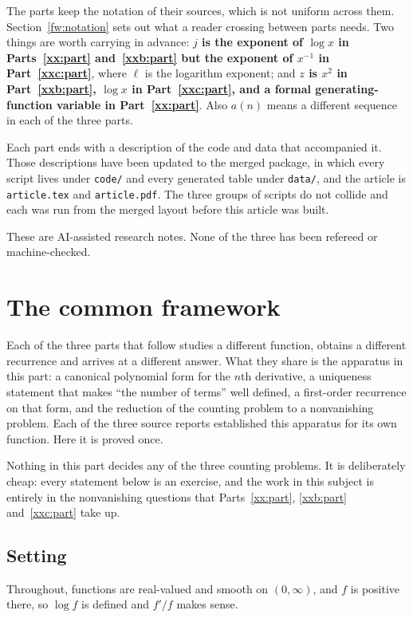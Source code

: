 \documentclass[11pt,a4paper]{article}
\numberwithin{equation}{section}
\theoremstyle{definition}
\theoremstyle{remark}
\theoremstyle{plain}
\begin{document}
The parts keep the notation of their sources, which is not uniform across them.
Section~\ref{fw:notation} sets out what a reader crossing between parts needs.
Two things are worth carrying in advance: \textbf{$j$ is the exponent of
$\log x$ in Parts~\ref{xx:part} and~\ref{xxb:part} but the exponent of $x^{-1}$
in Part~\ref{xxc:part}}, where $\ell$ is the logarithm exponent; and
\textbf{$z$ is $x^2$ in Part~\ref{xxb:part}, $\log x$ in Part~\ref{xxc:part},
and a formal generating-function variable in Part~\ref{xx:part}}.  Also
$a(n)$ means a different sequence in each of the three parts.

Each part ends with a description of the code and data that accompanied it.
Those descriptions have been updated to the merged package, in which every
script lives under \texttt{code/} and every generated table under
\texttt{data/}, and the article is \texttt{article.tex} and
\texttt{article.pdf}.  The three groups of scripts do not collide and each was
run from the merged layout before this article was built.

These are AI-assisted research notes.  None of the three has been refereed or
machine-checked.

\section{The common framework}\label{fw:sec}

Each of the three parts that follow studies a different function, obtains a
different recurrence and arrives at a different answer.  What they share is the
apparatus in this part: a canonical polynomial form for the $n$th derivative, a
uniqueness statement that makes ``the number of terms'' well defined, a
first-order recurrence on that form, and the reduction of the counting problem
to a nonvanishing problem.  Each of the three source reports established this
apparatus for its own function.  Here it is proved once.

Nothing in this part decides any of the three counting problems.  It is
deliberately cheap: every statement below is an exercise, and the work in this
subject is entirely in the nonvanishing questions that Parts~\ref{xx:part},
\ref{xxb:part} and~\ref{xxc:part} take up.

\subsection{Setting}\label{fw:setting}

Throughout, functions are real-valued and smooth on $(0,\infty)$, and $f$ is
positive there, so $\log f$ is defined and $f'/f$ makes sense.
\end{document}
